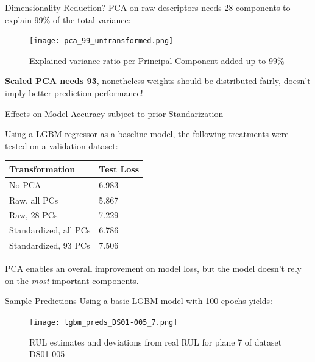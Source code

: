 \documentclass{beamer}
\begin{document}
        \begin{frame}{Dimensionality Reduction?}
            PCA on raw descriptors needs 28 components to explain 99\% of the total variance:
            \begin{figure}
                \centering
                \texttt{[image: pca\_99\_untransformed.png]}
                \caption{Explained variance ratio per Principal Component added up to 99\%}
            \end{figure}

            \textbf{Scaled PCA needs 93}, nonetheless weights should be distributed fairly, doesn't imply better prediction performance!
        \end{frame}

        \begin{frame}{Effects on Model Accuracy subject to prior Standarization}

            Using a LGBM regressor as a baseline model, the following treatments were tested on a validation dataset:
            \begin{table}[!htbp]
                \begin{tabular}{ll}
                    \hline
                    Transformation & Test Loss \\
                    \hline
                    No PCA & 6.983 \\
                    Raw, all PCs & 5.867 \\
                    Raw, 28 PCs & 7.229 \\
                    Standardized, all PCs & 6.786 \\
                    Standardized, 93 PCs & 7.506 \\
                    \hline
                \end{tabular}
            \end{table}

            PCA enables an overall improvement on model loss, but the model doesn't rely on the \textit{most} important components.
        \end{frame}

        \begin{frame}{Sample Predictions}
            Using a basic LGBM model with 100 epochs yields:
            \begin{figure}
                \centering
                \texttt{[image: lgbm\_preds\_DS01-005\_7.png]}
                \caption{RUL estimates and deviations from real RUL for plane 7 of dataset DS01-005}
            \end{figure}
        \end{frame}
\end{document}

